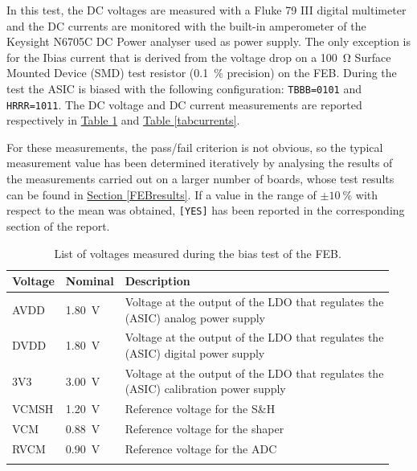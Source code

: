 In this test, the DC voltages are measured with a Fluke 79 III digital multimeter and the DC currents are monitored with the built-in amperometer of the Keysight N6705C
DC Power analyser used as power supply. The only exception is for the Ibias current that is derived from the voltage drop on a \SI{100}{\ohm} Surface Mounted Device (SMD) test resistor (\SI{0.1}{\percent} precision) on the FEB. During the test the ASIC is biased with the following configuration: \texttt{TBBB=0101} and \texttt{HRRR=1011}. The DC voltage and DC current measurements are reported respectively in \hyperref[tabvoltages]{Table \ref{tabvoltages}} and \hyperref[tabcurrents]{Table \ref{tabcurrents}}.

\par
For these measurements, the pass/fail criterion is not obvious, so the typical measurement value has been determined iteratively by analysing the results of the measurements carried out on a larger number of boards, whose test results can be found in \hyperref[FEBresults]{Section \ref{FEBresults}}. If a value in the range of $\pm \SI{10}{\percent}$ with respect to the mean was obtained, \texttt{[YES]}
has been reported in the corresponding section of the report.

\begin{table}[ht]
    \centering
    \begin{tabular}{l l l} 
         \Xhline{2\arrayrulewidth}
         Voltage & Nominal & Description \T\B \\
         \hline
         AVDD & \SI{1.80}{\volt} & \makecell[l]{Voltage at the output of the LDO that regulates the  \T \\ (ASIC) analog power supply \B} \\ 
         DVDD & \SI{1.80}{\volt} & \makecell[l]{Voltage at the output of the LDO that regulates \T the \\ (ASIC) digital power supply \B} \\ 
         3V3 & \SI{3.00}{\volt} & \makecell[l]{Voltage at the output of the LDO that regulates \T the \\ (ASIC) calibration power supply \B} \\ 
         VCMSH & \SI{1.20}{\volt} & Reference voltage for the S\&H \T\B \\ 
         VCM & \SI{0.88}{\volt} & Reference voltage for the shaper \T\B \\ 
         RVCM & \SI{0.90}{\volt} & Reference voltage for the ADC \T\B \\ 
         \Xhline{2\arrayrulewidth}
    \end{tabular}
    \caption{List of voltages measured during the bias test of the FEB.}
    \label{tabvoltages}
\end{table}


